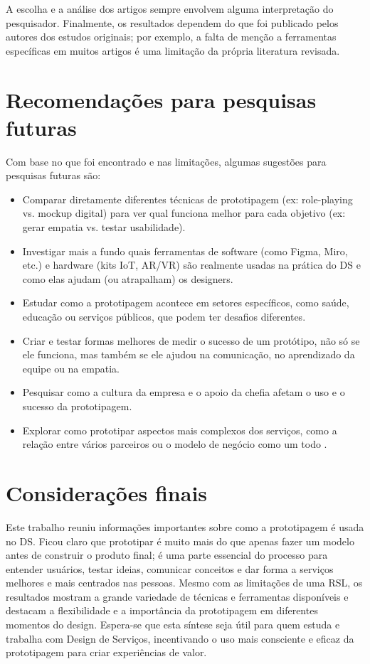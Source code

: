 A escolha e a análise dos artigos sempre envolvem alguma interpretação do pesquisador. Finalmente, os resultados dependem do que foi publicado pelos autores dos estudos originais; por exemplo, a falta de menção a ferramentas específicas em muitos artigos é uma limitação da própria literatura revisada.

\section{Recomendações para pesquisas futuras}

Com base no que foi encontrado e nas limitações, algumas sugestões para pesquisas futuras são:
\begin{itemize}
	\item Comparar diretamente diferentes técnicas de prototipagem (ex: role-playing vs. mockup digital) para ver qual funciona melhor para cada objetivo (ex: gerar empatia vs. testar usabilidade).
	
	\item Investigar mais a fundo quais ferramentas de software (como Figma, Miro, etc.) e hardware (kits IoT, AR/VR) são realmente usadas na prática do DS e como elas ajudam (ou atrapalham) os designers.
	
	\item Estudar como a prototipagem acontece em setores específicos, como saúde, educação ou serviços públicos, que podem ter desafios diferentes.
	
	\item Criar e testar formas melhores de medir o sucesso de um protótipo, não só se ele funciona, mas também se ele ajudou na comunicação, no aprendizado da equipe ou na empatia.
	
	\item Pesquisar como a cultura da empresa e o apoio da chefia afetam o uso e o sucesso da prototipagem.
	
	\item Explorar como prototipar aspectos mais complexos dos serviços, como a relação entre vários parceiros ou o modelo de negócio como um todo \cite{mager2023product, yan2022pssvalue}.
	
\end{itemize}


\section{Considerações finais}

Este trabalho reuniu informações importantes sobre como a prototipagem é usada no DS. Ficou claro que prototipar é muito mais do que apenas fazer um modelo antes de construir o produto final; é uma parte essencial do processo para entender usuários, testar ideias, comunicar conceitos e dar forma a serviços melhores e mais centrados nas pessoas. Mesmo com as limitações de uma RSL, os resultados mostram a grande variedade de técnicas e ferramentas disponíveis e destacam a flexibilidade e a importância da prototipagem em diferentes momentos do design. Espera-se que esta síntese seja útil para quem estuda e trabalha com Design de Serviços, incentivando o uso mais consciente e eficaz da prototipagem para criar experiências de valor.

